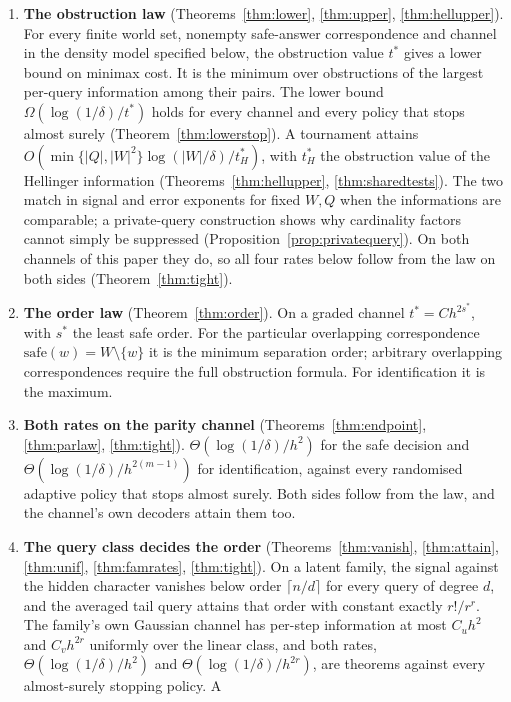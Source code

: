\begin{enumerate}
\item[1)] \textbf{The obstruction law} (Theorems~\ref{thm:lower}, \ref{thm:upper},
\ref{thm:hellupper}). For every
finite world set, nonempty safe-answer correspondence and channel in the density model
specified below, the obstruction value $t^{*}$ gives a lower bound on minimax cost.
It is the minimum over obstructions of the largest per-query information among their pairs.
The lower bound $\Omega(\log(1/\delta)/t^{*})$ holds for every channel and every policy that
stops almost surely (Theorem~\ref{thm:lowerstop}). A
tournament attains $O(\min\{|Q|,|W|^{2}\}\log(|W|/\delta)/t^{*}_{H})$, with $t^{*}_{H}$ the
obstruction value of the Hellinger information (Theorems~\ref{thm:hellupper},
\ref{thm:sharedtests}). The two match in signal and error exponents for fixed $W,Q$ when the
informations are comparable; a private-query construction shows why cardinality factors
cannot simply be suppressed (Proposition~\ref{prop:privatequery}). On both channels of this paper they do, so all four
rates below follow from the law on both sides (Theorem~\ref{thm:tight}).
\item[2)] \textbf{The order law} (Theorem~\ref{thm:order}). On a graded channel $t^{*}=Ch^{2s^{*}}$,
with $s^{*}$ the least safe order. For the particular overlapping correspondence
$\mathrm{safe}(w)=W\setminus\{w\}$ it is the minimum separation order; arbitrary overlapping
correspondences require the full obstruction formula. For identification it is the maximum.
\item[3)] \textbf{Both rates on the parity channel} (Theorems~\ref{thm:endpoint},
\ref{thm:parlaw}, \ref{thm:tight}). $\Theta(\log(1/\delta)/h^{2})$ for the safe decision and
$\Theta(\log(1/\delta)/h^{2(m-1)})$ for identification, against every randomised adaptive policy
that stops almost surely. Both sides follow from the law, and the channel's own decoders attain
them too.
\item[4)] \textbf{The query class decides the order} (Theorems~\ref{thm:vanish},
\ref{thm:attain}, \ref{thm:unif}, \ref{thm:famrates}, \ref{thm:tight}). On a latent family, the signal against
the hidden character vanishes below order $\lceil n/d\rceil$ for every query of degree $d$, and
the averaged tail query attains that order with constant exactly $r!/r^{r}$. The family's own
Gaussian channel has per-step information at most $C_{u}h^{2}$ and $C_{v}h^{2r}$ uniformly over
the linear class, and both rates, $\Theta(\log(1/\delta)/h^{2})$ and
$\Theta(\log(1/\delta)/h^{2r})$, are theorems against every almost-surely stopping policy. A

\end{enumerate}

